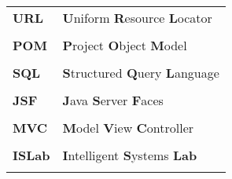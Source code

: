 \documentclass[a4paper, 12pt, oneside]{Thesis}  %
\begin{document}
\begin{table}[!h]
\begin{tabular}{ll}
	\textbf{URL}	& \textbf{U}niform \textbf{R}esource  \textbf{L}ocator  \\ \\
	\textbf{POM}	& \textbf{P}roject \textbf{O}bject  \textbf{M}odel  \\ \\
	\textbf{SQL}	& \textbf{S}tructured \textbf{Q}uery  \textbf{L}anguage  \\ \\
	\textbf{JSF}	& \textbf{J}ava \textbf{S}erver  \textbf{F}aces  \\ \\
	\textbf{MVC}	& \textbf{M}odel \textbf{V}iew  \textbf{C}ontroller  \\ \\			      	\textbf{ISLab}	& \textbf{I}ntelligent \textbf{S}ystems  \textbf{Lab}  \\ \\
\end{tabular}
\end{table}
\newpage
\thispagestyle{empty}
\mbox{}





\pagestyle{empty}  %




\mainmatter	  %
\lhead[\rm\thepage]{\fancyplain{}{\sl{\rightmark}}}
\pagestyle{fancy}  %



 

 



 

 
\end{document}
